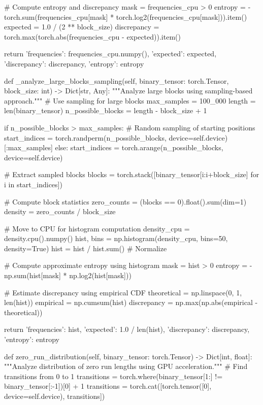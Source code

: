         # Compute entropy and discrepancy
        mask = frequencies_cpu > 0
        entropy = -torch.sum(frequencies_cpu[mask] * torch.log2(frequencies_cpu[mask])).item()
        expected = 1.0 / (2 ** block_size)
        discrepancy = torch.max(torch.abs(frequencies_cpu - expected)).item()
        
        return {
            'frequencies': frequencies_cpu.numpy(),
            'expected': expected,
            'discrepancy': discrepancy,
            'entropy': entropy
        }

    def _analyze_large_blocks_sampling(self, binary_tensor: torch.Tensor, block_size: int) -> Dict[str, Any]:
        """Analyze large blocks using sampling-based approach."""
        # Use sampling for large blocks
        max_samples = 100_000
        length = len(binary_tensor)
        n_possible_blocks = length - block_size + 1
        
        if n_possible_blocks > max_samples:
            # Random sampling of starting positions
            start_indices = torch.randperm(n_possible_blocks, device=self.device)[:max_samples]
        else:
            start_indices = torch.arange(n_possible_blocks, device=self.device)
            
        # Extract sampled blocks
        blocks = torch.stack([binary_tensor[i:i+block_size] for i in start_indices])
        
        # Compute block statistics
        zero_counts = (blocks == 0).float().sum(dim=1)
        density = zero_counts / block_size
        
        # Move to CPU for histogram computation
        density_cpu = density.cpu().numpy()
        hist, bins = np.histogram(density_cpu, bins=50, density=True)
        hist = hist / hist.sum()  # Normalize
        
        # Compute approximate entropy using histogram
        mask = hist > 0
        entropy = -np.sum(hist[mask] * np.log2(hist[mask]))
        
        # Estimate discrepancy using empirical CDF
        theoretical = np.linspace(0, 1, len(hist))
        empirical = np.cumsum(hist)
        discrepancy = np.max(np.abs(empirical - theoretical))
        
        return {
            'frequencies': hist,
            'expected': 1.0 / len(hist),
            'discrepancy': discrepancy,
            'entropy': entropy
        }

    def zero_run_distribution(self, binary_tensor: torch.Tensor) -> Dict[int, float]:
        """Analyze distribution of zero run lengths using GPU acceleration."""
        # Find transitions from 0 to 1
        transitions = torch.where(binary_tensor[1:] != binary_tensor[:-1])[0] + 1
        transitions = torch.cat([torch.tensor([0], device=self.device), transitions])
        

